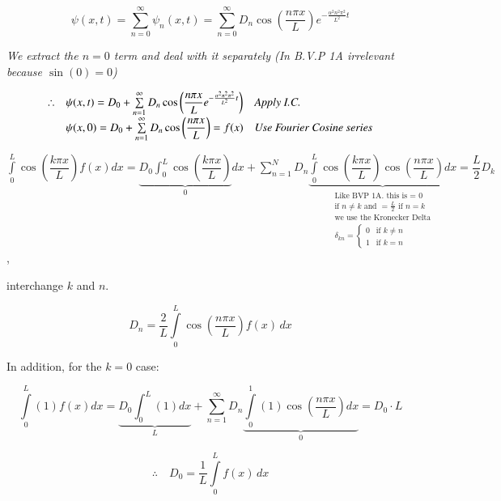 \documentclass{report}
\begin{document}
$$\psi(x,t)=\sum\limits_{n=0}^{\infty}\psi_n(x,t)=\sum\limits_{n=0}^{\infty}D_n\cos\left(\dfrac{n\pi x}{L}\right)e^{-\frac{\alpha^2n^2\pi^2}{L^2}t}$$

\textit{We extract the $n=0$ term and deal with it separately (In B.V.P 1A irrelevant because $\sin(0)=0$)}

$$\begin{array}{lll}
    \therefore & \psi(x,t)=D_0+\sum\limits_{n=1}^{\infty}D_n\cos\left(\dfrac{n\pi x}{L}e^{-\frac{\alpha^2n^2\pi^2}{L^2}t}\right) & \text{\textit{Apply I.C.}}  \\
     & \psi(x,0)=D_0+\sum\limits_{n=1}^{\infty}D_n\cos\left(\dfrac{n\pi x}{L}\right) =f(x) & \text{\textit{Use Fourier Cosine series}}
\end{array}$$

$\displaystyle\int\limits_0^L\cos\left(\dfrac{k\pi x}{L}\right)f(x)dx=\underbrace{D_0\displaystyle\int_0^L\cos\left(\dfrac{k\pi x}{L}\right)}_{0}dx+\sum\limits_{n=1}^ND_n\underbrace{\displaystyle\int\limits_{0}^L\cos\left(\dfrac{k\pi x}{L}\right)\cos\left(\dfrac{n\pi x}{L}\right)dx}_{\substack{\text{Like BVP 1A. this is = 0}\\
\text{if $n\neq k$ and $=\frac{L}{2}$ if $n=k$}\\
\text{we use the Kronecker Delta}\\
\delta_{kn}=\left\{\begin{array}{ll}
     0 & \text{if } k\neq n  \\
     1 & \text{if } k=n 
\end{array}\right.}}=\dfrac{L}{2}D_k$,

interchange $k$ and $n$.

\begin{equation}\label{eq_1}
    \boxed{
        D_n = \dfrac{2}{L} \int\limits_0^L \cos\left(\dfrac{n\pi x}{L}\right) f(x) \, dx
    }
\end{equation}


In addition, for the $k=0$ case:

\begin{equation}\label{eq_2}
    \displaystyle\int\limits_{0}^{L}(1) f(x) d x=\underbrace{D_{0} \int_{0}^{L}(1) d x}_{L} + \sum\limits_{n=1}^{\infty} D_{n} \underbrace{\displaystyle\int\limits_{0}^{1}(1) \cos \left(\dfrac{n \pi x}{L}\right) d x}_{0}=D_{0} \cdot L
\end{equation}

\[
\therefore \quad \boxed{D_0 = \dfrac{1}{L} \int\limits_0^L f(x) \, dx}
\]
\end{document}
